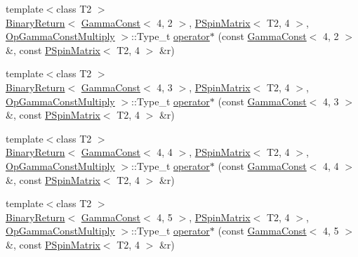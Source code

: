\begin{DoxyCompactItemize}
\item 
{\footnotesize template$<$class T2 $>$ }\\\mbox{\hyperlink{structENSEM_1_1BinaryReturn}{Binary\+Return}}$<$ \mbox{\hyperlink{classENSEM_1_1GammaConst}{Gamma\+Const}}$<$ 4, 2 $>$, \mbox{\hyperlink{classENSEM_1_1PSpinMatrix}{P\+Spin\+Matrix}}$<$ T2, 4 $>$, \mbox{\hyperlink{structENSEM_1_1OpGammaConstMultiply}{Op\+Gamma\+Const\+Multiply}} $>$\+::Type\+\_\+t \mbox{\hyperlink{group__primspinmatrix_ga55de5be902e508670e59d7c11c319618}{operator$\ast$}} (const \mbox{\hyperlink{classENSEM_1_1GammaConst}{Gamma\+Const}}$<$ 4, 2 $>$ \&, const \mbox{\hyperlink{classENSEM_1_1PSpinMatrix}{P\+Spin\+Matrix}}$<$ T2, 4 $>$ \&r)
\item 
{\footnotesize template$<$class T2 $>$ }\\\mbox{\hyperlink{structENSEM_1_1BinaryReturn}{Binary\+Return}}$<$ \mbox{\hyperlink{classENSEM_1_1GammaConst}{Gamma\+Const}}$<$ 4, 3 $>$, \mbox{\hyperlink{classENSEM_1_1PSpinMatrix}{P\+Spin\+Matrix}}$<$ T2, 4 $>$, \mbox{\hyperlink{structENSEM_1_1OpGammaConstMultiply}{Op\+Gamma\+Const\+Multiply}} $>$\+::Type\+\_\+t \mbox{\hyperlink{group__primspinmatrix_gaeffd66ff58d2cd7122d34c77e7109255}{operator$\ast$}} (const \mbox{\hyperlink{classENSEM_1_1GammaConst}{Gamma\+Const}}$<$ 4, 3 $>$ \&, const \mbox{\hyperlink{classENSEM_1_1PSpinMatrix}{P\+Spin\+Matrix}}$<$ T2, 4 $>$ \&r)
\item 
{\footnotesize template$<$class T2 $>$ }\\\mbox{\hyperlink{structENSEM_1_1BinaryReturn}{Binary\+Return}}$<$ \mbox{\hyperlink{classENSEM_1_1GammaConst}{Gamma\+Const}}$<$ 4, 4 $>$, \mbox{\hyperlink{classENSEM_1_1PSpinMatrix}{P\+Spin\+Matrix}}$<$ T2, 4 $>$, \mbox{\hyperlink{structENSEM_1_1OpGammaConstMultiply}{Op\+Gamma\+Const\+Multiply}} $>$\+::Type\+\_\+t \mbox{\hyperlink{group__primspinmatrix_gabc287f892d11c49158f8022c393a8516}{operator$\ast$}} (const \mbox{\hyperlink{classENSEM_1_1GammaConst}{Gamma\+Const}}$<$ 4, 4 $>$ \&, const \mbox{\hyperlink{classENSEM_1_1PSpinMatrix}{P\+Spin\+Matrix}}$<$ T2, 4 $>$ \&r)
\item 
{\footnotesize template$<$class T2 $>$ }\\\mbox{\hyperlink{structENSEM_1_1BinaryReturn}{Binary\+Return}}$<$ \mbox{\hyperlink{classENSEM_1_1GammaConst}{Gamma\+Const}}$<$ 4, 5 $>$, \mbox{\hyperlink{classENSEM_1_1PSpinMatrix}{P\+Spin\+Matrix}}$<$ T2, 4 $>$, \mbox{\hyperlink{structENSEM_1_1OpGammaConstMultiply}{Op\+Gamma\+Const\+Multiply}} $>$\+::Type\+\_\+t \mbox{\hyperlink{group__primspinmatrix_ga1fbaa359542d933fd3150bbcdf5006d5}{operator$\ast$}} (const \mbox{\hyperlink{classENSEM_1_1GammaConst}{Gamma\+Const}}$<$ 4, 5 $>$ \&, const \mbox{\hyperlink{classENSEM_1_1PSpinMatrix}{P\+Spin\+Matrix}}$<$ T2, 4 $>$ \&r)

\end{DoxyCompactItemize}
